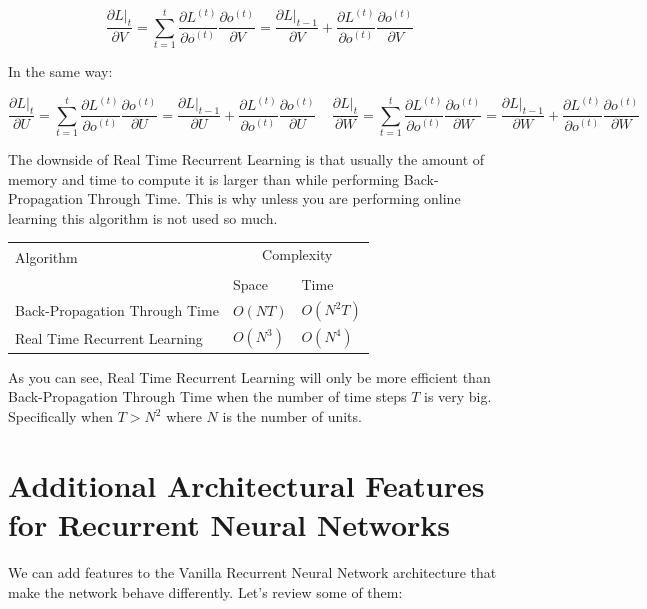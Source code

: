 $$ \frac{\partial L|_t}{\partial V} =  \sum_{t=1}^{t} \frac{\partial L^{(t)}}{\partial o^{(t)} } \frac{\partial o^{(t)}}{\partial V  } = \frac{\partial L|_{t-1}}{\partial V} + \frac{\partial L^{(t)}}{\partial o^{(t)} } \frac{\partial o^{(t)}}{\partial V  }  $$

\noindent In the same way:

$$ \frac{\partial L|_t}{\partial U} =  \sum_{t=1}^{t} \frac{\partial L^{(t)}}{\partial o^{(t)} } \frac{\partial o^{(t)}}{\partial U  } = \frac{\partial L|_{t-1}}{\partial U} + \frac{\partial L^{(t)}}{\partial o^{(t)} } \frac{\partial o^{(t)}}{\partial U  } ~~~~~  \frac{\partial L|_t}{\partial W} =  \sum_{t=1}^{t} \frac{\partial L^{(t)}}{\partial o^{(t)} } \frac{\partial o^{(t)}}{\partial W  } = \frac{\partial L|_{t-1}}{\partial W} + \frac{\partial L^{(t)}}{\partial o^{(t)} } \frac{\partial o^{(t)}}{\partial W  }  $$

\noindent The downside of Real Time Recurrent Learning is that usually the amount of memory and time to compute it is larger than while performing Back-Propagation Through Time. This is why unless you are performing online learning this algorithm is not used so much. 

\begin{table}[h!]
\centering
\begin{tabular}{ p{6cm} p{3cm} p{3cm} } 
\hline\hline
\multirow{2}{*}{Algorithm} & \multicolumn{2}{c}{Complexity}\\ \cline{2-3}\\ & Space & Time \\ \hline

Back-Propagation Through Time & $O(NT)$ & $O(N^{2}T)$ \\ 
Real Time Recurrent Learning & $O(N^{3})$ & $ O(N^{4})$ \\
\hline
\end{tabular}
\end{table}

\noindent As you can see,  Real Time Recurrent Learning will only be more efficient than Back-Propagation Through Time when the number of time steps $T$ is very big. Specifically when $T > N^{2}$ where $N$ is the number of units.

\newpage
\section{Additional Architectural Features for Recurrent Neural Networks}

We can add features to the Vanilla Recurrent Neural Network architecture that make the network behave differently. Let's review some of them:

